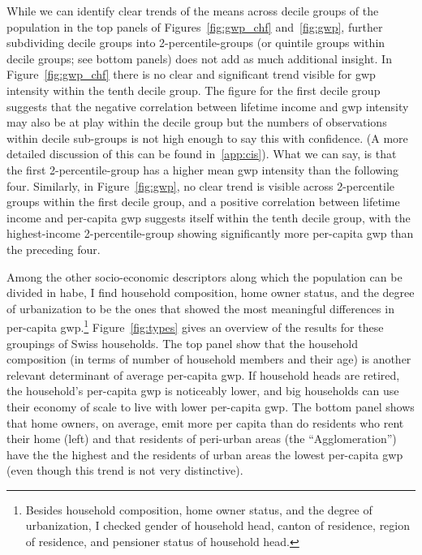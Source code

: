 \documentclass[a4paper,11pt,abstract=true]{scrartcl}
\begin{document}
\clearpage

While we can identify clear trends of the means across decile groups of the population in the top panels of Figures~\ref{fig:gwp_chf} and~\ref{fig:gwp}, further subdividing decile groups into 2-percentile-groups (or quintile groups within decile groups; see bottom panels) does not add as much additional insight.
In Figure~\ref{fig:gwp_chf} there is no clear and significant trend visible for \ac{gwp} intensity within the tenth decile group.
The figure for the first decile group suggests that the negative correlation between lifetime income and \ac{gwp} intensity may also be at play within the decile group but the numbers of observations within decile sub-groups is not high enough to say this with confidence.
(A more detailed discussion of this can be found in~\ref{app:cis}).
What we can say, is that the first 2-percentile-group has a higher mean \ac{gwp} intensity than the following four.
Similarly, in Figure~\ref{fig:gwp}, no clear trend is visible across 2-percentile groups within the first decile group, and a positive correlation between lifetime income and per-capita \ac{gwp} suggests itself within the tenth decile group, with the highest-income 2-percentile-group showing significantly more per-capita \ac{gwp} than the preceding four.

Among the other socio-economic descriptors along which the population can be divided in \ac{habe}, I find household composition, home owner status, and the degree of urbanization to be the ones that showed the most meaningful differences in per-capita \ac{gwp}.\footnote{%
  Besides household composition, home owner status, and the degree of urbanization, I checked gender of household head, canton of residence, region of residence, and pensioner status of household head.
}
Figure~\ref{fig:types} gives an overview of the results for these groupings of Swiss households.
The top panel show that the household composition (in terms of number of household members and their age) is another relevant determinant of average per-capita \ac{gwp}.
If household heads are retired, the household's per-capita \ac{gwp} is noticeably lower, and big households can use their economy of scale to live with lower per-capita \ac{gwp}.
The bottom panel shows that home owners, on average, emit more per capita than do residents who rent their home (left) and that residents of peri-urban areas (the ``Agglomeration'') have the the highest and the residents of urban areas the lowest per-capita \ac{gwp} (even though this trend is not very distinctive).
\end{document}
